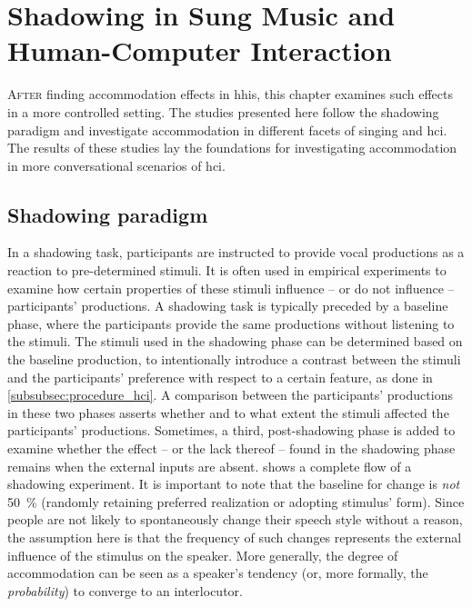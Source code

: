 \chapter{Shadowing in Sung Music and Human-Computer Interaction}
\label{chap:shadowing_in_sung_music_and_human_computer_interaction}

\lettrine{A}{fter} finding accommodation effects in \aclp{hhi}, this chapter examines such effects in a more controlled setting.
The studies presented here follow the shadowing paradigm and investigate accommodation in different facets of singing and \acl{hci}.
The results of these studies lay the foundations for investigating accommodation in more conversational scenarios of \acl{hci}.

\pagebreak

\acresetall

\section{Shadowing paradigm}
\label{sec:shadowing_paradigm}

In a shadowing task, participants are instructed to provide vocal productions as a reaction to pre-determined stimuli.
It is often used in empirical experiments \citep[e.g.,][]{Goldinger1998echoes} to examine how certain properties of these stimuli influence -- or do not influence -- participants' productions.
A shadowing task is typically preceded by a baseline phase, where the participants provide the same productions without listening to the stimuli.
The stimuli used in the shadowing phase can be determined based on the baseline production, to intentionally introduce a contrast between the stimuli and the participants' preference with respect to a certain feature, as done in \cref{subsubsec:procedure_hci}.
A comparison between the participants' productions in these two phases asserts whether and to what extent the stimuli affected the participants' productions.
Sometimes, a third, post-shadowing phase is added to examine whether the effect -- or the lack thereof -- found in the shadowing phase remains when the external inputs are absent.
 shows a complete flow of a shadowing experiment.
It is important to note that the baseline for change is \emph{not} \SI{50}{\percent} (randomly retaining preferred realization or adopting stimulus' form).
Since people are not likely to spontaneously change their speech style without a reason, the assumption here is that the frequency of such changes represents the external influence of the stimulus on the speaker.
More generally, the degree of accommodation can be seen as a speaker's tendency (or, more formally, the \emph{probability}) to converge to an interlocutor.

